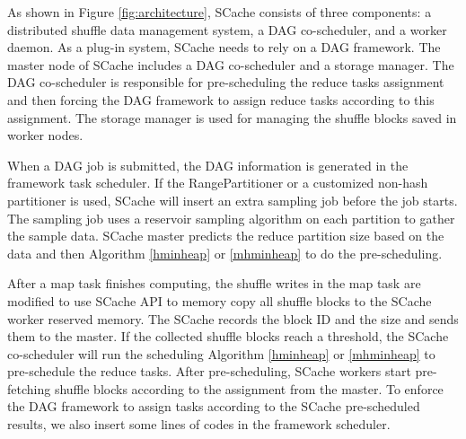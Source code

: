 {\color{black}
As shown in Figure \ref{fig:architecture}, SCache consists of three components: a distributed shuffle data management system, a DAG co-scheduler, and a worker daemon.
As a plug-in system, SCache needs to rely on a DAG framework. 
The master node of SCache includes a DAG co-scheduler and a storage manager.
The DAG co-scheduler is responsible for pre-scheduling the reduce tasks assignment and then forcing the DAG framework to assign reduce tasks according to this assignment.
The storage manager is used for managing the shuffle blocks saved in worker nodes.

When a DAG job is submitted, the DAG information is generated in the framework task scheduler. 
If the RangePartitioner or a customized non-hash partitioner is used, SCache will insert an extra sampling job before the job starts.
The sampling job uses a reservoir sampling algorithm \cite{reservoir} on each partition to gather the sample data.
SCache master predicts the reduce partition size based on the data and then  Algorithm \ref{hminheap} or \ref{mhminheap} to do the pre-scheduling.

After a map task finishes computing, the shuffle writes in the map task are modified to use SCache API to memory copy all shuffle blocks to the SCache worker reserved memory.
The SCache records the block ID and the size and sends them to the master.
If the collected shuffle blocks reach a threshold, the SCache co-scheduler will run the scheduling Algorithm \ref{hminheap} or \ref{mhminheap} to pre-schedule the reduce tasks.
After pre-scheduling, SCache workers start pre-fetching shuffle blocks according to the assignment from the master.
To enforce the DAG framework to assign tasks according to the SCache pre-scheduled results, we also insert some lines of codes in the framework scheduler.
}
